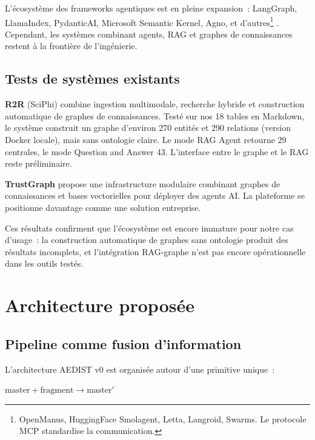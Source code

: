 \documentclass[a4paper,11pt]{report}
\begin{document}
L'écosystème des frameworks agentiques est en pleine expansion~: LangGraph, LlamaIndex, PydanticAI, Microsoft Semantic Kernel, Agno, et d'autres\footnote{OpenManus, HuggingFace Smolagent, Letta, Langroid, Swarms. Le protocole MCP standardise la communication.} \citep{ZF27JTIS,CVBHDNL3,LKNBDMMK}. Cependant, les systèmes combinant agents, RAG et graphes de connaissances restent à la frontière de l'ingénierie.

\section{Tests de systèmes existants}

\textbf{R2R} (SciPhi) \citep{S95D9L3Y} combine ingestion multimodale, recherche hybride et construction automatique de graphes de connaissances. Testé sur nos 18 tables en Markdown, le système construit un graphe d'environ 270 entités et 290 relations (version Docker locale), mais sans ontologie claire. Le mode RAG Agent retourne 29 centrales, le mode Question and Answer 43. L'interface entre le graphe et le RAG reste préliminaire.

\textbf{TrustGraph} propose une infrastructure modulaire combinant graphes de connaissances et bases vectorielles pour déployer des agents AI. La plateforme se positionne davantage comme une solution entreprise.

Ces résultats confirment que l'écosystème est encore immature pour notre cas d'usage~: la construction automatique de graphes sans ontologie produit des résultats incomplets, et l'intégration RAG-graphe n'est pas encore opérationnelle dans les outils testés.

\chapter{Architecture proposée}\label{chap:architecture}

\section{Pipeline comme fusion d'information}

L'architecture AEDIST v0 est organisée autour d'une primitive unique~:

\begin{center}
$\mathrm{master} + \mathrm{fragment} \longrightarrow \mathrm{master}'$
\end{center}
\end{document}
